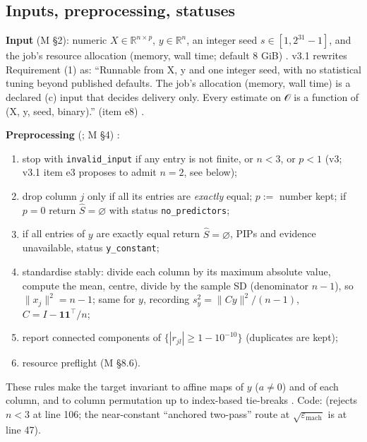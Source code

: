 \subsection{Inputs, preprocessing, statuses}\label{sec:method-pre}

\textbf{Input} (M \S2): numeric $X\in\mathbb R^{n\times p}$, $y\in\mathbb R^n$, an integer seed $s\in[1,2^{31}-1]$, and the
job's resource allocation (memory, wall time; default 8 GiB) . v3.1 rewrites
Requirement (1) as: ``Runnable from X, y and one integer seed, with no statistical tuning beyond published defaults. The
job's allocation (memory, wall time) is a declared (c) input that decides delivery only. Every estimate on 𝒪 is a
function of (X, y, seed, binary).'' (item e8) .

\textbf{Preprocessing} (; M \S4) :
\begin{enumerate}[label=(\arabic*)]
\item stop with \texttt{invalid\_input} if any entry is not finite, or $n<3$, or $p<1$ (v3; v3.1 item e3 proposes to admit
  $n=2$, see below);
\item drop column $j$ only if all its entries are \emph{exactly} equal; $p:=$ number kept; if $p=0$ return $\hat S=\varnothing$
  with status \texttt{no\_predictors};
\item if all entries of $y$ are exactly equal return $\hat S=\varnothing$, PIPs and evidence unavailable, status
  \texttt{y\_constant};
\item standardise stably: divide each column by its maximum absolute value, compute the mean, centre, divide by the sample SD
  (denominator $n-1$), so $\|x_j\|^2=n-1$; same for $y$, recording $s_y^2=\|Cy\|^2/(n-1)$, $C=I-\mathbf 1\mathbf 1^\top/n$;
\item report connected components of $\{|r_{jl}|\ge 1-10^{-10}\}$ (duplicates are kept);
\item resource preflight (M \S8.6).
\end{enumerate}
These rules make the target invariant to affine maps of $y$ ($a\ne0$) and of each column, and to column permutation up to
index-based tie-breaks . Code: 
(rejects $n<3$ at line 106; the near-constant ``anchored two-pass'' route at $\sqrt{\varepsilon_{\mathrm{mach}}}$ is at line 47).

